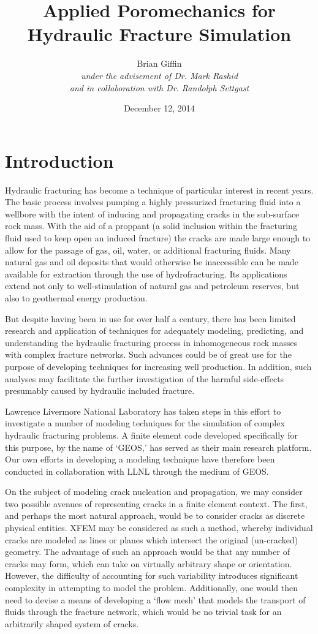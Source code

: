 \documentclass[11pt]{article} %
\title{\textbf{Applied Poromechanics for Hydraulic Fracture Simulation}}
\author{
  Brian Giffin\\
  \textit{under the advisement of Dr. Mark Rashid}\\
  \textit{and in collaboration with Dr. Randolph Settgast}
}
\date{December 12, 2014} %
\begin{document}
\maketitle

\section{Introduction}

Hydraulic fracturing has become a technique of particular interest in recent years. The basic process involves pumping a highly pressurized fracturing fluid into a wellbore with the intent of inducing and propagating cracks in the sub-surface rock mass. With the aid of a proppant (a solid inclusion within the fracturing fluid used to keep open an induced fracture) the cracks are made large enough to allow for the passage of gas, oil, water, or additional fracturing fluids. Many natural gas and oil deposits that would otherwise be inaccessible can be made available for extraction through the use of hydrofracturing. Its applications extend not only to well-stimulation of natural gas and petroleum reserves, but also to geothermal energy production.

But despite having been in use for over half a century, there has been limited research and application of techniques for adequately modeling, predicting, and understanding the hydraulic fracturing process in inhomogeneous rock masses with complex fracture networks. Such advances could be of great use for the purpose of developing techniques for increasing well production. In addition, such analyses may facilitate the further investigation of the harmful side-effects presumably caused by hydraulic included fracture.

Lawrence Livermore National Laboratory has taken steps in this effort to investigate a number of modeling techniques for the simulation of complex hydraulic fracturing problems. A finite element code developed specifically for this purpose, by the name of `GEOS,' has served as their main research platform. Our own efforts in developing a modeling technique have therefore been conducted in collaboration with LLNL through the medium of GEOS.

On the subject of modeling crack nucleation and propagation, we may consider two possible avenues of representing cracks in a finite element context. The first, and perhaps the most natural approach, would be to consider cracks as discrete physical entities. XFEM may be considered as such a method, whereby individual cracks are modeled as lines or planes which intersect the original (un-cracked) geometry. The advantage of such an approach would be that any number of cracks may form, which can take on virtually arbitrary shape or orientation. However, the difficulty of accounting for such variability introduces significant complexity in attempting to model the problem. Additionally, one would then need to devise a means of developing a `flow mesh' that models the transport of fluids through the fracture network, which would be no trivial task for an arbitrarily shaped system of cracks.
\end{document}
